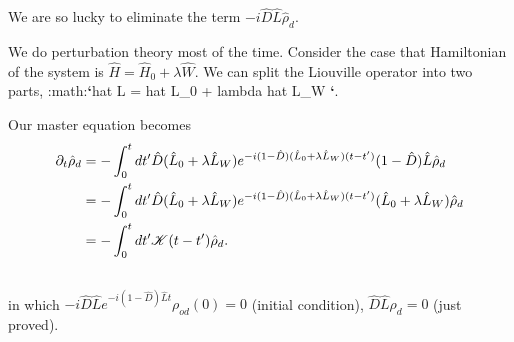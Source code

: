 \documentclass[letterpaper,10pt,english]{sphinxmanual}
\begin{document}
We are so lucky to eliminate the term $-i\hat D\hat L\hat \rho_d$.

We do perturbation theory most of the time. Consider the case that Hamiltonian of the system is $\hat H = \hat H_0 + \lambda \hat W$. We can split the Liouville operator into two parts, :math:{\color{red}\bfseries{}{}`}hat L = hat L\_0 + lambda hat L\_W {\color{red}\bfseries{}{}`}.

Our master equation becomes
\begin{gather}
\begin{split}\partial_t \hat \rho_d & =  -  \int_0^t dt' \hat D (\hat L_0 + \lambda \hat L_W ) e^{-i(1-\hat D) (\hat L_0 + \lambda \hat L_W  )(t-t')}(1-\hat D)\hat L \hat \rho_d \\
& =  -  \int_0^t dt' \hat D (\hat L_0 + \lambda \hat L_W ) e^{-i(1-\hat D)  (\hat L_0 + \lambda \hat L_W ) (t-t')} (\hat L_0 + \lambda \hat L_W ) \hat \rho_d \\
& =  -  \int_0^t dt' \mathscr K(t-t') \hat \rho_d .\end{split}\notag\\\begin{split}\end{split}\notag
\end{gather}
in which $- i \hat D \hat L e^{-i(1-\hat D)\hat L t} \rho_{od}(0) = 0$ (initial condition), $\hat D \hat L \rho_d = 0$ (just proved).
\end{document}
